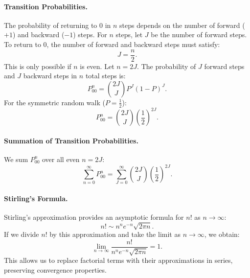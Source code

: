 \paragraph{Transition Probabilities.}  
The probability of returning to \( 0 \) in \( n \) steps depends on the number of forward (\(+1\)) and backward (\(-1\)) steps. For \( n \) steps, let \( J \) be the number of forward steps. To return to \( 0 \), the number of forward and backward steps must satisfy:  
\[
J = \frac{n}{2}.
\]  
This is only possible if \( n \) is even. Let \( n = 2J \).  \newline
The probability of \( J \) forward steps and \( J \) backward steps in \( n \) total steps is:  
\[
P^n_{00} = \binom{2J}{J} P^J (1-P)^J.
\]  
For the symmetric random walk (\( P = \frac{1}{2} \)):  
\[
P^n_{00} = \binom{2J}{J} \left(\frac{1}{2}\right)^{2J}.
\]

\paragraph{Summation of Transition Probabilities.}  
We sum \( P^n_{00} \) over all even \( n = 2J \):  
\[
\sum_{n=0}^\infty P^n_{00} = \sum_{J=0}^\infty \binom{2J}{J} \left(\frac{1}{2}\right)^{2J}.
\]  

\paragraph{Stirling's Formula.}  
Stirling's approximation provides an asymptotic formula for \( n! \) as \( n \to \infty \):
\[
n! \sim n^n e^{-n} \sqrt{2 \pi n}.
\]
If we divide \( n! \) by this approximation and take the limit as \( n \to \infty \), we obtain:
\[
\lim_{n \to \infty} \frac{n!}{n^n e^{-n} \sqrt{2 \pi n}} = 1.
\]
This allows us to replace factorial terms with their approximations in series, preserving convergence properties.

